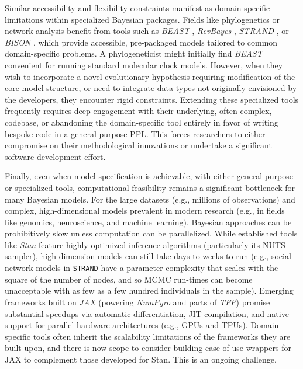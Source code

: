 \documentclass[num-refs]{wiley-article}
\begin{document}
Similar accessibility and flexibility constraints manifest as domain-specific limitations within specialized Bayesian packages. Fields like phylogenetics or network analysis benefit from tools such as \textit{BEAST} \citep{BEAST}, \textit{RevBayes} \citep{RevBayes}, \textit{STRAND} \citep{STRAND1}, or \textit{BISON} \citep{BISON}, which provide accessible, pre-packaged models tailored to common domain-specific problems. A phylogeneticist might initially find \textit{BEAST} convenient for running standard molecular clock models. However, when they wish to incorporate a novel evolutionary hypothesis requiring modification of the core model structure, or need to integrate data types not originally envisioned by the developers, they encounter rigid constraints. Extending these specialized tools frequently requires deep engagement with their underlying, often complex, codebase, or abandoning the domain-specific tool entirely in favor of writing bespoke code in a general-purpose PPL. This forces researchers to either compromise on their methodological innovations or undertake a significant software development effort. 

Finally, even when model specification is achievable, with either general-purpose or specialized tools, computational feasibility remains a significant bottleneck for many Bayesian models. For the large datasets (e.g., millions of observations) and complex, high-dimensional models prevalent in modern research (e.g., in fields like genomics, neuroscience, and machine learning), Bayesian approaches can be prohibitively slow unless computation can be parallelized. While established tools like \textit{Stan} feature highly optimized inference algorithms (particularly its NUTS sampler), high-dimension models can still take days-to-weeks to run (e.g., social network models in \texttt{STRAND} have a parameter complexity that scales with the square of the number of nodes, and so MCMC run-times can become unacceptable with as few as a few hundred individuals in the sample). Emerging frameworks built on \textit{JAX} \citep{jax2018github} (powering \textit{NumPyro} and parts of \textit{TFP}) promise substantial speedups via automatic differentiation, JIT compilation, and native support for parallel hardware architectures (e.g., GPUs and TPUs). Domain-specific tools often inherit the scalability limitations of the frameworks they are built upon, and there is now scope to consider building ease-of-use wrappers for JAX to complement those developed for Stan. This is an ongoing challenge. 
\end{document}
